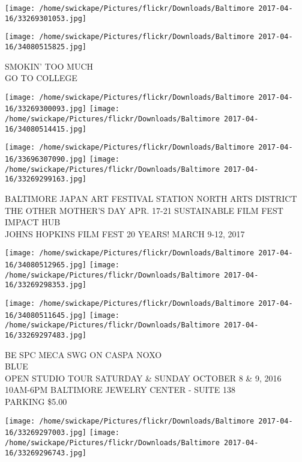 \documentclass[10pt,letterpaper]{article}
\begin{document}
\texttt{[image: /home/swickape/Pictures/flickr/Downloads/Baltimore 2017-04-16/33269301053.jpg]}

\vspace{0.25in}
\texttt{[image: /home/swickape/Pictures/flickr/Downloads/Baltimore 2017-04-16/34080515825.jpg]}

SMOKIN' TOO MUCH\\
GO TO COLLEGE\\
\pagebreak

\texttt{[image: /home/swickape/Pictures/flickr/Downloads/Baltimore 2017-04-16/33269300093.jpg]}
\texttt{[image: /home/swickape/Pictures/flickr/Downloads/Baltimore 2017-04-16/34080514415.jpg]}

\texttt{[image: /home/swickape/Pictures/flickr/Downloads/Baltimore 2017-04-16/33696307090.jpg]}
\texttt{[image: /home/swickape/Pictures/flickr/Downloads/Baltimore 2017-04-16/33269299163.jpg]}

BALTIMORE JAPAN ART FESTIVAL STATION NORTH ARTS DISTRICT\\
THE OTHER MOTHER'S DAY APR. 17{-}21 SUSTAINABLE FILM FEST\\
IMPACT HUB\\
JOHNS HOPKINS FILM FEST 20 YEARS!  MARCH 9{-}12, 2017\\
\pagebreak

\texttt{[image: /home/swickape/Pictures/flickr/Downloads/Baltimore 2017-04-16/34080512965.jpg]}
\texttt{[image: /home/swickape/Pictures/flickr/Downloads/Baltimore 2017-04-16/33269298353.jpg]}

\texttt{[image: /home/swickape/Pictures/flickr/Downloads/Baltimore 2017-04-16/34080511645.jpg]}
\texttt{[image: /home/swickape/Pictures/flickr/Downloads/Baltimore 2017-04-16/33269297483.jpg]}

BE SPC MECA SWG ON CASPA NOXO\\
BLUE\\
OPEN STUDIO TOUR SATURDAY \& SUNDAY OCTOBER 8 \& 9, 2016 10AM{-}6PM BALTIMORE JEWELRY CENTER {-} SUITE 138\\
PARKING \$5.00\\
\pagebreak

\texttt{[image: /home/swickape/Pictures/flickr/Downloads/Baltimore 2017-04-16/33269297003.jpg]}
\texttt{[image: /home/swickape/Pictures/flickr/Downloads/Baltimore 2017-04-16/33269296743.jpg]}
\end{document}
